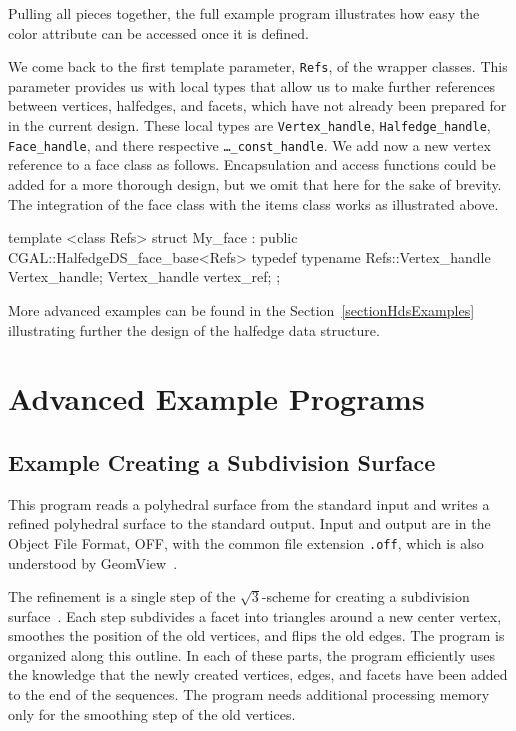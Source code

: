 Pulling all pieces together, the full example program illustrates how easy
the color attribute can be accessed once it is defined.


We come back to the first template parameter, \texttt{Refs}, of the
wrapper classes. This parameter provides us with local types that
allow us to make further references between vertices, halfedges, and
facets, which have not already been prepared for in the current
design. These local types are \texttt{Vertex\_handle},
\texttt{Halfedge\_handle}, \texttt{Face\_handle}, and there respective
\texttt{\ldots\_const\_handle}. We add now a new vertex reference to a
face class as follows. Encapsulation and access functions could be
added for a more thorough design, but we omit that here for the sake
of brevity. The integration of the face class with the items class
works as illustrated above.

\begin{ccExampleCode}
template <class Refs>
struct My_face : public CGAL::HalfedgeDS_face_base<Refs> {
    typedef typename Refs::Vertex_handle Vertex_handle;
    Vertex_handle vertex_ref;
};
\end{ccExampleCode}

More advanced examples can be found in the Section~\ref{sectionHdsExamples}
illustrating further the design of the halfedge data structure.


\section{Advanced Example Programs}
\label{sectionPolyAdvanced}

\subsection{Example Creating a Subdivision Surface}

This program reads a polyhedral surface from the standard input and
writes a refined polyhedral surface to the standard output. Input and
output are in the Object File Format, OFF, with the common file
extension {\tt .off}, which is also understood by
GeomView~\cite{cgal:p-gmgv16-96}.

The refinement is a single step of the $\sqrt{3}$-scheme for creating
a subdivision surface~\cite{cgal:k-s-00}. Each step subdivides a facet
into triangles around a new center vertex, smoothes the position of the
old vertices, and flips the old edges. The program is organized along
this outline. In each of these parts, the program efficiently uses the
knowledge that the newly created vertices, edges, and facets have been
added to the end of the sequences. The program needs additional
processing memory only for the smoothing step of the old vertices.

